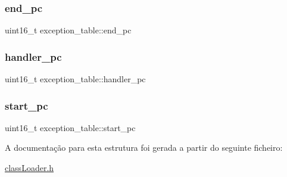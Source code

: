 \hypertarget{structexception__table_a89ade5c549c9ef70d35df9601c71f6e6}{}\label{structexception__table_a89ade5c549c9ef70d35df9601c71f6e6} 
\subsubsection{\texorpdfstring{end\+\_\+pc}{end\_pc}}
{\footnotesize\ttfamily uint16\+\_\+t exception\+\_\+table\+::end\+\_\+pc}

\hypertarget{structexception__table_a3e662a079f9184d56df7e26c268bc271}{}\label{structexception__table_a3e662a079f9184d56df7e26c268bc271} 
\subsubsection{\texorpdfstring{handler\+\_\+pc}{handler\_pc}}
{\footnotesize\ttfamily uint16\+\_\+t exception\+\_\+table\+::handler\+\_\+pc}

\hypertarget{structexception__table_af5b06605eecd81fe73512c8fd001cfd1}{}\label{structexception__table_af5b06605eecd81fe73512c8fd001cfd1} 
\subsubsection{\texorpdfstring{start\+\_\+pc}{start\_pc}}
{\footnotesize\ttfamily uint16\+\_\+t exception\+\_\+table\+::start\+\_\+pc}



A documentação para esta estrutura foi gerada a partir do seguinte ficheiro\+:\begin{DoxyCompactItemize}
\item 
\hyperlink{class_loader_8h}{class\+Loader.\+h}\end{DoxyCompactItemize}
